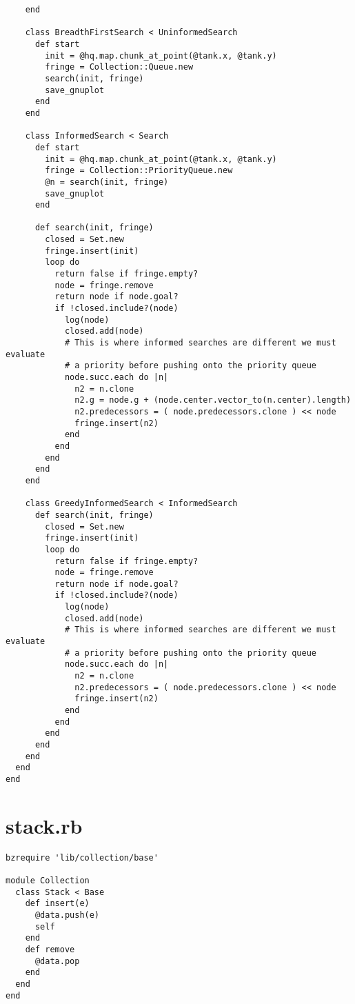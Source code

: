 \begin{verbatim}
    end

    class BreadthFirstSearch < UninformedSearch
      def start
        init = @hq.map.chunk_at_point(@tank.x, @tank.y)
        fringe = Collection::Queue.new
        search(init, fringe)
        save_gnuplot
      end
    end

    class InformedSearch < Search
      def start
        init = @hq.map.chunk_at_point(@tank.x, @tank.y)
        fringe = Collection::PriorityQueue.new
        @n = search(init, fringe)
        save_gnuplot
      end

      def search(init, fringe)
        closed = Set.new
        fringe.insert(init)
        loop do
          return false if fringe.empty?
          node = fringe.remove
          return node if node.goal?
          if !closed.include?(node)
            log(node)
            closed.add(node)
            # This is where informed searches are different we must evaluate
            # a priority before pushing onto the priority queue
            node.succ.each do |n|
              n2 = n.clone
              n2.g = node.g + (node.center.vector_to(n.center).length)
              n2.predecessors = ( node.predecessors.clone ) << node
              fringe.insert(n2)
            end
          end
        end
      end
    end

    class GreedyInformedSearch < InformedSearch
      def search(init, fringe)
        closed = Set.new
        fringe.insert(init)
        loop do
          return false if fringe.empty?
          node = fringe.remove
          return node if node.goal?
          if !closed.include?(node)
            log(node)
            closed.add(node)
            # This is where informed searches are different we must evaluate
            # a priority before pushing onto the priority queue
            node.succ.each do |n|
              n2 = n.clone
              n2.predecessors = ( node.predecessors.clone ) << node
              fringe.insert(n2)
            end
          end
        end
      end
    end
  end
end
\end{verbatim}


\section{stack.rb}
\begin{verbatim}
bzrequire 'lib/collection/base'

module Collection
  class Stack < Base
    def insert(e)
      @data.push(e)
      self
    end
    def remove
      @data.pop
    end
  end
end
\end{verbatim}

